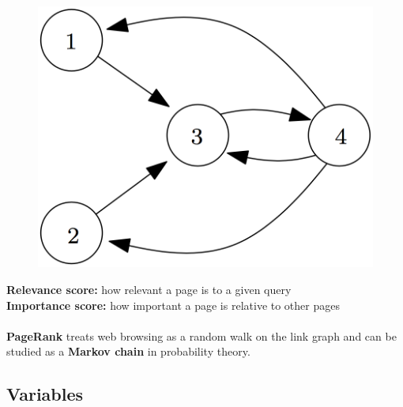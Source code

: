 \documentclass{article}
\begin{document}
\begin{figure}
\includegraphics[width=\linewidth]{web_graph.png}
\end{figure}

\textbf{Relevance score:} how relevant a page is to a given query
\\
\textbf{Importance score:} how important a page is relative to other pages \\
\\
\textbf{PageRank} treats web browsing as a random walk on the link graph and can be studied as a \textbf{Markov chain} in probability theory. \\

\subsection{Variables}
\end{document}
